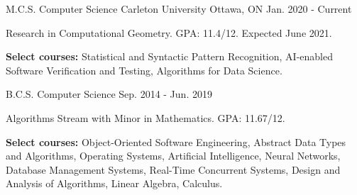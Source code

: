 \begin{cventries}

\educationentry
{M.C.S. Computer Science}
{Carleton University}
{Ottawa, ON}
{Jan. 2020 - Current}
{\begin{cvitems}
    \item {Research in Computational Geometry. GPA: 11.4/12. Expected June 2021.}
    \item {\textbf{Select courses:} Statistical and Syntactic Pattern Recognition, AI-enabled Software Verification and Testing, Algorithms for Data Science.}
\end{cvitems}}
{B.C.S. Computer Science}
{Sep. 2014 - Jun. 2019}
{\begin{cvitems}
    \item {Algorithms Stream with Minor in Mathematics. GPA: 11.67/12.}
    \item {\textbf{Select courses:} Object-Oriented Software Engineering, Abstract Data Types and Algorithms, Operating Systems, Artificial Intelligence, Neural Networks, Database Management Systems, Real-Time Concurrent Systems, Design and Analysis of Algorithms, Linear Algebra, Calculus.}
\end{cvitems}}

\end{cventries}
